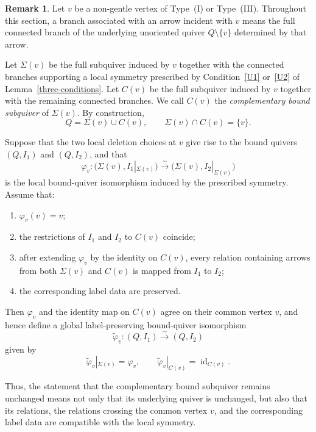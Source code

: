\documentclass[11pt]{amsart}
\numberwithin{equation}{section}
\theoremstyle{definition}
\newtheorem{remark}[theorem]{Remark}
\begin{document}
\begin{remark}\label{rem:complementary_bound_subquiver}
Let $v$ be a non-gentle vertex of Type~\textup{(I)} or
Type~\textup{(III)}. Throughout this section, a branch associated
with an arrow incident with $v$ means the full connected branch of
the underlying unoriented quiver $Q\setminus\{v\}$
determined by that arrow.

Let $\Sigma(v)$ be the full subquiver induced by $v$ together with
the connected branches supporting a local symmetry prescribed by
Condition~\ref{U1} or~\ref{U2} of
Lemma~\ref{three-conditions}. Let $C(v)$ be the full subquiver
induced by $v$ together with the remaining connected branches. We
call $C(v)$ the \emph{complementary bound subquiver} of
$\Sigma(v)$. By construction,
\[
Q=\Sigma(v)\cup C(v),
\qquad
\Sigma(v)\cap C(v)=\{v\}.
\]

Suppose that the two local deletion choices at $v$ give rise to
the bound quivers $(Q,I_1)$ and $(Q,I_2)$, and that
\[
\varphi_v:
\bigl(\Sigma(v),I_1|_{\Sigma(v)}\bigr)
\xrightarrow{\sim}
\bigl(\Sigma(v),I_2|_{\Sigma(v)}\bigr)
\]
is the local bound-quiver isomorphism induced by the prescribed
symmetry. Assume that:
\begin{enumerate}[label=\textup{(\arabic*)}]
  \item $\varphi_v(v)=v$;
  \item the restrictions of $I_1$ and $I_2$ to $C(v)$ coincide;
  \item after extending $\varphi_v$ by the identity on $C(v)$,
        every relation containing arrows from both
        $\Sigma(v)$ and $C(v)$ is mapped from $I_1$ to $I_2$;
  \item the corresponding label data are preserved.
\end{enumerate}
Then $\varphi_v$ and the identity map on $C(v)$ agree on their
common vertex $v$, and hence define a global label-preserving
bound-quiver isomorphism
\[
\widetilde{\varphi}_v:(Q,I_1)\xrightarrow{\sim}(Q,I_2)
\]
given by
\[
\widetilde{\varphi}_v|_{\Sigma(v)}=\varphi_v,
\qquad
\widetilde{\varphi}_v|_{C(v)}
=\operatorname{id}_{C(v)}.
\]

Thus, the statement that the complementary bound subquiver remains
unchanged means not only that its underlying quiver is unchanged,
but also that its relations, the relations crossing the common
vertex $v$, and the corresponding label data are compatible with
the local symmetry.
\end{remark}
\end{document}
